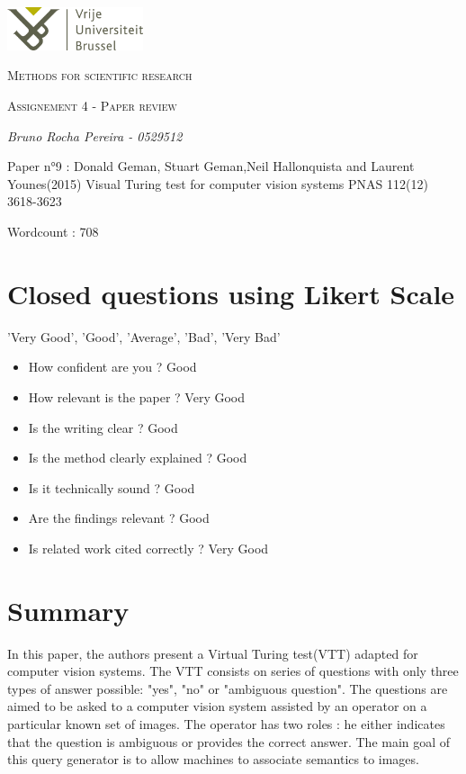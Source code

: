 \documentclass[10pt,a4paper]{scrartcl}
\begin{document}
\begin{titlepage}
    \centering
    \includegraphics[width=0.30\textwidth]{VUB.png}\par\vspace{1cm}
    {\scshape\Large Methods for scientific research\par}
    \vspace{1cm}
    {\scshape\Large Assignement 4 - Paper review\par}
    \vspace{1.5cm}
    {\Large\itshape Bruno Rocha Pereira - 0529512\par}
    \vfill
\end{titlepage}
\Large{Paper n°9 : Donald Geman, Stuart Geman,Neil Hallonquista and Laurent Younes(2015) Visual  
Turing test for computer vision systems PNAS 112(12) 3618-3623}
\begin{center}Wordcount : 708
\end{center}

\section{Closed questions using Likert Scale}
’Very Good’, ’Good’, ’Average’, ’Bad’, ’Very Bad’
\begin{itemize}
\item How confident are you ? Good
\item How relevant is the paper ? Very Good
\item Is the writing clear ? Good
\item Is the method clearly explained ? Good
\item Is it technically sound ? Good
\item Are the findings relevant ? Good
\item Is related work cited correctly ? Very Good
\end{itemize}
\section{Summary}
In this paper, the authors present a Virtual Turing test(VTT) adapted for computer vision systems. The VTT consists on series of questions with only three types of answer possible: "yes", "no" or "ambiguous question". The questions are aimed to be asked to a computer vision system assisted by an operator on a particular known set of images. The operator has two roles : he either indicates that the question is ambiguous or provides the correct answer. The main goal of this query generator is to allow machines to associate semantics to images. 
\end{document}
